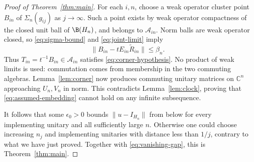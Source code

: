 \begin{proof}[Proof of Theorem~\ref{thm:main}]
For each $i,n$, choose a weak operator cluster point $B_{in}$ of
$\Sigma_n(g_{ij})$ as $j\to\infty$. Such a point exists by weak
operator compactness of the closed unit ball of $\B(H_n)$, and
belongs to $\mathcal A_{in}$. Norm balls are weak operator closed,
so \eqref{eq:sigma-bound} and \eqref{eq:joint-limit} imply
\[
 \|B_{in}-tE_{in}\widetilde R_{in}\|\leq\beta_n.
\]
Thus $T_{in}=t^{-1}B_{in}\in\mathcal A_{in}$ satisfies
\eqref{eq:corner-hypothesis}. No product of weak limits is used:
commutation comes from membership in the two commuting algebras.
Lemma~\ref{lem:corner} now produces commuting unitary matrices on
$\mathbb C^n$ approaching $U_n,V_n$ in norm. This contradicts
Lemma~\ref{lem:clock}, proving that \eqref{eq:assumed-embedding}
cannot hold on any infinite subsequence.

It follows that some $\epsilon_0>0$ bounds
$\|u-I_{H_n}\|$ from below for every implementing unitary and all
sufficiently large $n$. Otherwise one could choose increasing
$n_j$ and implementing unitaries with distance less than $1/j$,
contrary to what we have just proved. Together with
\eqref{eq:vanishing-gap}, this is Theorem~\ref{thm:main}.
\end{proof}
